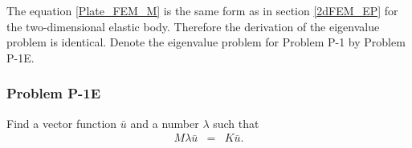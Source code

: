 \documentclass[../../main.tex]{subfiles}
\begin{document}
The equation \eqref{Plate_FEM_M} is the same form as in section \ref{2dFEM_EP} for the two-dimensional elastic body. Therefore the derivation of the eigenvalue problem is identical. Denote the eigenvalue problem for Problem P-1 by Problem P-1E.
\subsubsection{Problem P-1E}
Find a vector function $\bar{u}$ and a number $\lambda$ such that
\begin{eqnarray}
	M\lambda{\bar{u}} & = & K\bar{u}.
\end{eqnarray}
\end{document}
